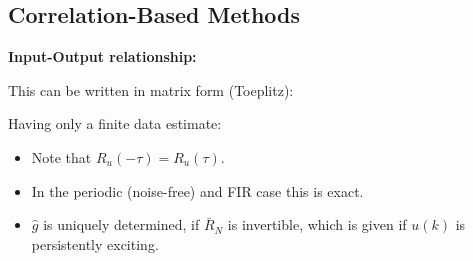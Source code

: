 \documentclass[10pt,a4paper]{scrartcl}
\begin{document}
\begin{multicols*}{2}

\subsection{Correlation-Based Methods}

\textbf{Input-Output relationship:}



This can be written in matrix form (Toeplitz):


Having only a finite data estimate:


\begin{itemize}
\item Note that $R_u(-\tau)=R_u(\tau)$.
\item In the periodic (noise-free) and FIR case this is exact.
\item $\hat{g}$ is uniquely determined, if $\bar{R}_N$ is invertible, which is given if $u(k)$ is persistently exciting.
\end{itemize}


\end{multicols*}
\end{document}
